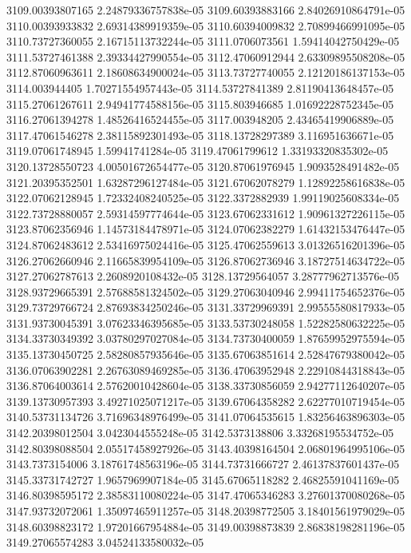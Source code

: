 {3109.00393807165 2.24879336757838e-05
3109.60393883166 2.84026910864791e-05
3110.00393933832 2.69314389919359e-05
3110.60394009832 2.70899466991095e-05
3110.73727360055 2.16715113732244e-05
3111.0706073561 1.59414042750429e-05
3111.53727461388 2.39334427990554e-05
3112.47060912944 2.63309895508208e-05
3112.87060963611 2.18608634900024e-05
3113.73727740055 2.12120186137153e-05
3114.003944405 1.70271554957443e-05
3114.53727841389 2.81190413648457e-05
3115.27061267611 2.94941774588156e-05
3115.803946685 1.01692228752345e-05
3116.27061394278 1.48526416524455e-05
3117.003948205 2.43465419906889e-05
3117.47061546278 2.38115892301493e-05
3118.13728297389 3.116951636671e-05
3119.07061748945 1.59941741284e-05
3119.47061799612 1.33193320835302e-05
3120.13728550723 4.00501672654477e-05
3120.87061976945 1.9093528491482e-05
3121.20395352501 1.63287296127484e-05
3121.67062078279 1.12892258616838e-05
3122.07062128945 1.72332408240525e-05
3122.3372882939 1.99119025608334e-05
3122.73728880057 2.59314597774644e-05
3123.67062331612 1.90961327226115e-05
3123.87062356946 1.14573184478971e-05
3124.07062382279 1.61432153476447e-05
3124.87062483612 2.53416975024416e-05
3125.47062559613 3.01326516201396e-05
3126.27062660946 2.11665839954109e-05
3126.87062736946 3.18727514634722e-05
3127.27062787613 2.2608920108432e-05
3128.13729564057 3.28777962713576e-05
3128.93729665391 2.57688581324502e-05
3129.27063040946 2.99411754652376e-05
3129.73729766724 2.87693834250246e-05
3131.33729969391 2.99555580817933e-05
3131.93730045391 3.07623346395685e-05
3133.53730248058 1.52282580632225e-05
3134.33730349392 3.03780297027084e-05
3134.73730400059 1.87659952975594e-05
3135.13730450725 2.58280857935646e-05
3135.67063851614 2.52847679380042e-05
3136.07063902281 2.26763089469285e-05
3136.47063952948 2.22910844318843e-05
3136.87064003614 2.57620010428604e-05
3138.33730856059 2.94277112640207e-05
3139.13730957393 3.49271025071217e-05
3139.67064358282 2.62277010719454e-05
3140.53731134726 3.71696348976499e-05
3141.07064535615 1.83256463896303e-05
3142.20398012504 3.0423044555248e-05
3142.5373138806 3.33268195534752e-05
3142.80398088504 2.05517458927926e-05
3143.40398164504 2.06801964995106e-05
3143.7373154006 3.18761748563196e-05
3144.73731666727 2.46137837601437e-05
3145.33731742727 1.9657969907184e-05
3145.67065118282 2.46825591041169e-05
3146.80398595172 2.38583110080224e-05
3147.47065346283 3.27601370080268e-05
3147.93732072061 1.35097465911257e-05
3148.20398772505 3.18401561979029e-05
3148.60398823172 1.97201667954884e-05
3149.00398873839 2.86838198281196e-05
3149.27065574283 3.04524133580032e-05
}
